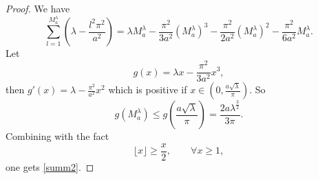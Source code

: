 \documentclass[11pt,letterpaper]{amsart}
\numberwithin{equation}{section}
\theoremstyle{plain}
\theoremstyle{plain}
\numberwithin{equation}{section}
\theoremstyle{remark}
\begin{document}
	\begin{proof}
		We have
		\begin{equation*}  
			\sum_{l=1}^{M_a^\lambda} (\lambda- \frac{l^2\pi^2}{a^2})  
			=
			\lambda M_a^\lambda-\frac{\pi^2}{3a^2}(M_a^\lambda)^3-\frac{\pi^2}{2a^2}(M_a^\lambda)^2-\frac{\pi^2}{6a^2}M_a^\lambda.
		\end{equation*} 
		Let 
		\begin{equation}\label{g}
			g(x)= \lambda x-\frac{\pi^2}{3a^2} x^3,
		\end{equation}
		then $g'(x)= \lambda- \frac{\pi^2}{a^2}x^2$ which is positive if $x\in (0,\frac{a\sqrt\lambda}{\pi})$. So 
		\begin{equation*}\label{ineq1}
			g(M^\lambda_a) \le g(\frac{a\sqrt{\lambda}}{\pi})= \frac{2a\lambda^{\frac{3}{2}}}{3\pi}.
		\end{equation*}
		Combining with the fact
		\[
		\lfloor{x}\rfloor \ge \frac{x}{2},\qquad \forall x\ge 1,
		\]
		one gets \eqref{summ2}. 
		

\end{proof}
\end{document}

